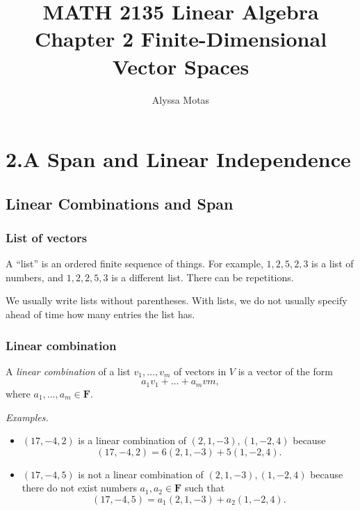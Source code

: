 \documentclass[11pt]{article}
\title{\textbf{MATH 2135 Linear Algebra} \\ Chapter 2 Finite-Dimensional Vector Spaces}
\author{Alyssa Motas}
\begin{document}
    \maketitle

    \pagebreak

    \tableofcontents

    \pagebreak

    \section{2.A Span and Linear Independence}

    \subsection{Linear Combinations and Span}

    \subsubsection{List of vectors}

    A ``list'' is an ordered finite sequence of things. For example, \(1,2,5,2,3\) is a list of numbers, and \(1,2,2,5,3\) is a different list. There can be repetitions. 

    We usually write lists without parentheses. With lists, we do not usually specify ahead of time how many entries the list has. 

    \subsubsection{Linear combination}

    A \emph{linear combination} of a list \(v_1, \dots, v_m\) of vectors in $V$ is a vector of the form \[a_1 v_1 + \dots + a_m vm,\] where \(a_1, \dots, a_m \in \textbf{F}\).

    \vspace{1em}

    \emph{Examples.}

    \begin{itemize}
        \item \((17,-4,2)\) is a linear combination of \((2,1,-3), (1,-2,4)\) because \[(17,-4,2) = 6(2,1,-3) + 5(1,-2,4).\]
        \item \((17,-4,5)\) is not a linear combination of \((2,1,-3), (1,-2,4)\) because there do not exist numbers \(a_1, a_2 \in \textbf{F}\) such that \[(17,-4,5) = a_1(2,1,-3) + a_2 (1,-2,4). \]
    \end{itemize}
\end{document}
